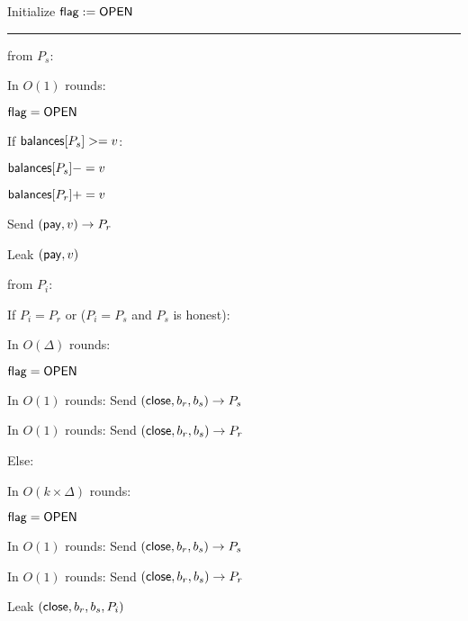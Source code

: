 \begin{bbox}[title={$\F_{\msf{pay}} (P_s, P_r, \msf{balances}, \Delta)$}]

Initialize ${\mathsf {flag}} := {\mathsf {OPEN}}$

\vspace{2mm} \hrule \vspace{2mm}

\OnInput {} from $P_s$:
	\begin{renumerate}
			\item In $O(1)$ rounds:  
				
				\quad \Require ${\mathsf {flag}} = {\mathsf {OPEN}}$
				
				\quad If ${\mathsf {balances}}[P_s] >= v$:
			
				\qquad ${\mathsf {balances}}[P_s] -= v$
				
				\qquad ${\mathsf {balances}}[P_r] += v$
				
				\qquad Send $({\mathsf {pay}}, v) \rightarrow P_r$

		\item Leak $({\mathsf {pay}}, v)$

	\end{renumerate}

\OnInput {} from $P_i$:
	\begin{renumerate}	
		\item If $P_i = P_r$ or ($P_i = P_s$ and $P_s$ is honest):
			\begin{renumerate}
			\item In $O(\Delta)$ rounds:  

			\qquad \Require ${\mathsf {flag}} = {\mathsf {OPEN}}$

			\qquad In $O(1)$ rounds:  Send $({\mathsf {close}}, b_r, b_s) \rightarrow P_s$

			\qquad In $O(1)$ rounds: Send $({\mathsf {close}}, b_r, b_s) \rightarrow P_r$

			\end{renumerate}

		Else:
		\begin{renumerate}
			\item In $O(k \times \Delta)$ rounds:

			\qquad \Require ${\mathsf {flag}} = {\mathsf {OPEN}}$

			\qquad In $O(1)$ rounds:  Send $({\mathsf {close}}, b_r, b_s) \rightarrow P_s$

			\qquad In $O(1)$ rounds:  Send $({\mathsf {close}}, b_r, b_s) \rightarrow P_r$

		\end{renumerate}
		
		\item Leak $({\mathsf {close}}, b_r, b_s, P_i)$
		
	\end{renumerate}

\end{bbox}
